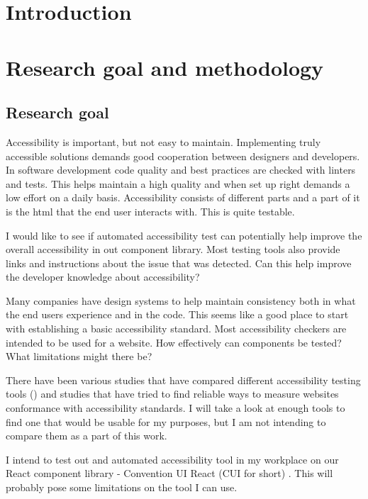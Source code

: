 \documentclass{master_thesis}
\begin{document}
\tableofcontents

\section*{Introduction}

\section{Research goal and methodology}
	\subsection{Research goal}
Accessibility is important, but not easy to maintain. Implementing truly accessible solutions demands good cooperation between designers and developers. In software development code quality and best practices are checked with linters and tests. This helps maintain a high quality and when set up right demands a low effort on a daily basis. Accessibility consists of different parts and a part of it is the html that the end user interacts with. This is quite testable.

I would like to see if automated accessibility test can potentially help improve the overall accessibility in out component library. Most testing tools also provide links and instructions about the issue that was detected. Can this help improve the developer knowledge about accessibility?

Many companies have design systems to help maintain consistency both in what the end users experience and in the code. This seems like a good place to start with establishing a basic accessibility standard. Most accessibility checkers are intended to be used for a website. How effectively can components be tested? What limitations might there be?

There have been various studies that have compared different accessibility testing tools () and studies that have tried to find reliable ways to measure websites conformance with accessibility standards. I will take a look at enough tools to find one that would be usable for my purposes, but I am not intending to compare them as a part of this work.

I intend to test out and automated accessibility tool in my workplace on our React component library - Convention UI React (CUI for short) . This will probably pose some limitations on the tool I can use.
\end{document}
